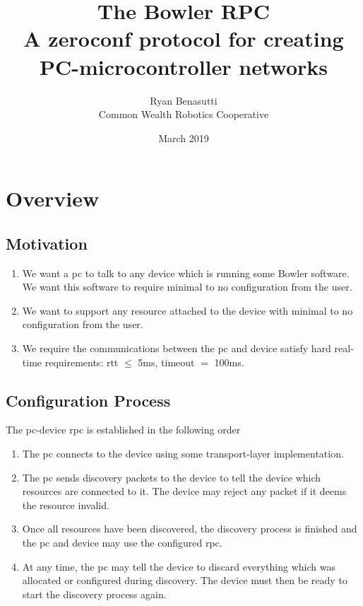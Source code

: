 \documentclass{article}
\title{
    The Bowler RPC \\
    \large A zeroconf protocol for creating PC-microcontroller networks
}
\author{Ryan Benasutti \\ Common Wealth Robotics Cooperative}
\date{March 2019}
\begin{document}
\maketitle

\section{Overview}
\subsection{Motivation}

\begin{enumerate}
    \item We want a \gls{pc} to talk to any \gls{device} which is running some Bowler software. We
    want this software to require minimal to no configuration from the user.
    
    \item We want to support any \gls{resource} attached to the \gls{device} with minimal to no
    configuration from the user.

    \item We require the communications between the \gls{pc} and \gls{device} satisfy hard real-time
    requirements: \gls{rtt} $\leq$ 5ms, timeout $=$ 100ms.
\end{enumerate}

\subsection{Configuration Process}

The \gls{pc}-\gls{device} \gls{rpc} is established in the following order
\begin{enumerate}
    \item The \gls{pc} connects to the \gls{device} using some \gls{transport-layer} implementation.
    
    \item The \gls{pc} sends \gls{discovery} packets to the \gls{device} to tell the \gls{device} which
    \glspl{resource} are connected to it. The \gls{device} may reject any packet if it deems the
    \gls{resource} invalid.
    
    \item Once all \glspl{resource} have been discovered, the \gls{discovery} process is finished and the
    \gls{pc} and \gls{device} may use the configured \gls{rpc}.

    \item At any time, the \gls{pc} may tell the \gls{device} to discard everything which was
    allocated or configured during \gls{discovery}. The \gls{device} must then be ready to start the
    \gls{discovery} process again.
\end{enumerate}
\end{document}
